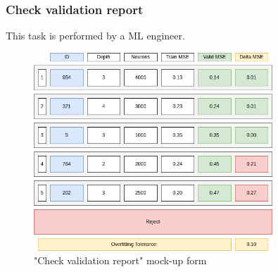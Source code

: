 \subsubsection{Check validation report}

This task is performed by a ML engineer.

\begin{figure}[H]
\centering
\includegraphics[width=0.8\textwidth]{figures/check_validation_report.png}
\caption{"Check validation report" mock-up form}
\end{figure}

